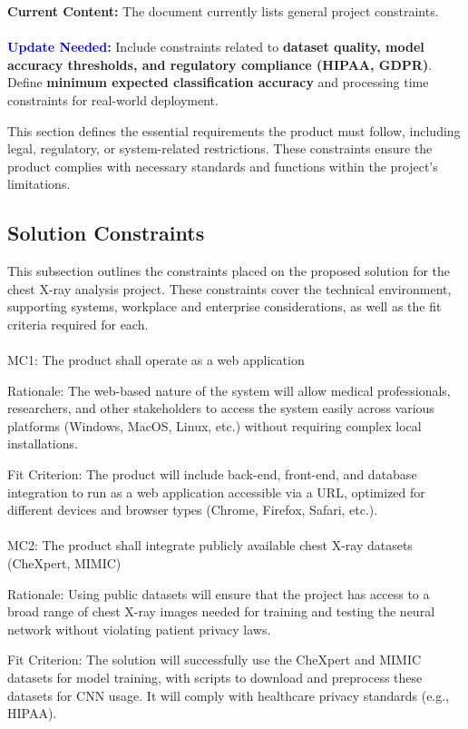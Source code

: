 \documentclass[12pt]{article}
\begin{document}
\textbf{Current Content:} The document currently lists general project constraints. \\
\\
\textbf{\textcolor{blue}{Update Needed:}} Include constraints related to \textbf{dataset quality, model accuracy thresholds, and regulatory compliance (HIPAA, GDPR)}. Define \textbf{minimum expected classification accuracy} and processing time constraints for real-world deployment.


This section defines the essential requirements the product must follow, including legal, 
regulatory, or system-related restrictions. These constraints ensure the product complies with 
necessary standards and functions within the project's limitations.

\subsection{Solution Constraints}
This subsection outlines the constraints placed on the proposed solution for the chest X-ray 
analysis project. These constraints cover the technical environment, supporting systems, workplace 
and enterprise considerations, as well as the fit criteria required for each.
\\\\
\indent
MC1: The product shall operate as a web application

Rationale: The web-based nature of the system will allow medical professionals, researchers, and 
other stakeholders to access the system easily across various platforms (Windows, MacOS, Linux, 
etc.) without requiring complex local installations.

Fit Criterion: The product will include back-end, front-end, and database integration to run as a 
web application accessible via a URL, optimized for different devices and browser types (Chrome, 
Firefox, Safari, etc.).
\\\\
\indent
MC2: The product shall integrate publicly available chest X-ray datasets (CheXpert, MIMIC)

Rationale: Using public datasets will ensure that the project has access to a broad range of chest 
X-ray images needed for training and testing the neural network without violating patient privacy 
laws.

Fit Criterion: The solution will successfully use the CheXpert and MIMIC datasets for model 
training, with scripts to download and preprocess these datasets for CNN usage. It will comply 
with healthcare privacy standards (e.g., HIPAA).
\end{document}

